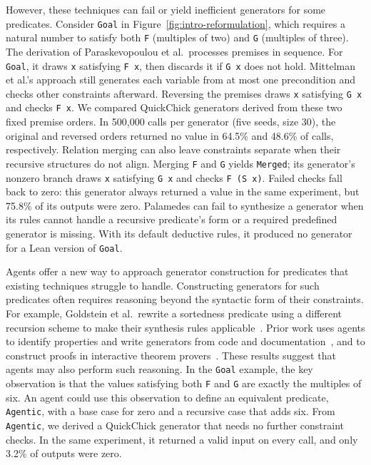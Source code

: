 However, these techniques can fail or yield inefficient generators for some predicates.
Consider \texttt{Goal} in Figure~\ref{fig:intro-reformulation}, which requires
a natural number to satisfy both \texttt{F} (multiples of two) and
\texttt{G} (multiples of three).
The derivation of Paraskevopoulou et al.\ processes premises in sequence.
For \texttt{Goal}, it draws \texttt{x} satisfying \texttt{F x},
then discards it if \texttt{G x} does not hold.
Mittelman et al.'s approach still generates each variable from at most one
precondition and checks other constraints afterward.
Reversing the premises draws \texttt{x} satisfying
\texttt{G x} and checks \texttt{F x}.
We compared QuickChick generators derived from these two fixed premise orders.
In 500,000 calls per generator (five seeds, size 30),
the original and reversed orders returned no value in 64.5\% and
48.6\% of calls, respectively.
Relation merging can also leave constraints separate when their recursive
structures do not align.
Merging \texttt{F} and \texttt{G} yields \texttt{Merged}; its generator's nonzero
branch draws \texttt{x} satisfying \texttt{G x} and checks \texttt{F (S x)}.
Failed checks fall back to zero: this generator always returned a value in the
same experiment, but 75.8\% of its outputs were zero.
Palamedes can fail to synthesize a generator when its rules cannot handle a
recursive predicate's form or a required predefined generator is missing.
With its default deductive rules, it produced no generator for a Lean version
of \texttt{Goal}.

Agents offer a new way to approach generator construction for predicates that
existing techniques struggle to handle.
Constructing generators for such predicates often requires reasoning beyond
the syntactic form of their constraints.
For example, Goldstein et al.\ rewrite a sortedness predicate using a different
recursion scheme to make their synthesis rules applicable~\cite{goldstein26palamedes}.
Prior work uses agents to identify properties and write generators from code
and documentation~\cite{maaz25agentic}, and to construct proofs in interactive
theorem provers~\cite{thakur24copra}.
These results suggest that agents may also perform such reasoning.
In the \texttt{Goal} example, the key observation is that the values satisfying both
\texttt{F} and \texttt{G} are exactly the multiples of six.
An agent could use this observation to define an equivalent predicate,
\texttt{Agentic}, with a base case for zero and a recursive case that adds six.
From \texttt{Agentic}, we derived a QuickChick generator that needs no further
constraint checks.
In the same experiment, it returned a valid input on every call, and only
3.2\% of outputs were zero.

